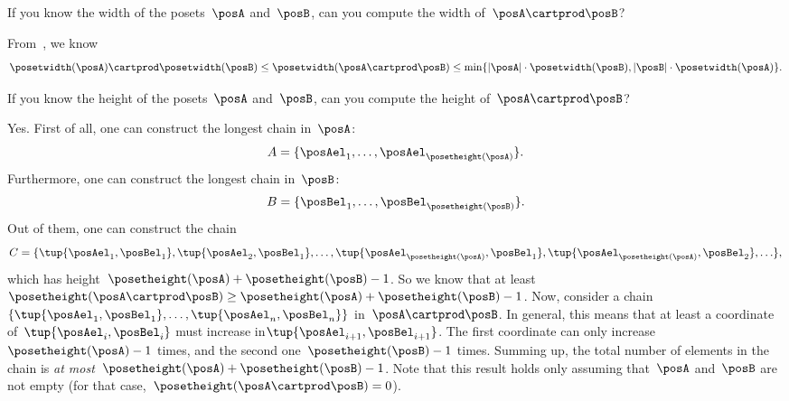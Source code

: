 \begin{exercise}
	\label{ex:width}
	If you know the width of the posets~$\posA$ and~$\posB$, can you compute the width of~$\posA\cartprod\posB$?
\end{exercise}
\begin{solution}
	From~\cite{bezrukovantichains}, we know
	\begin{equation*}
		\posetwidth(\posA)\cartprod \posetwidth(\posB)\leq \posetwidth(\posA\cartprod \posB)\leq \min \{ \vert \posA\vert \cdot \posetwidth(\posB),\vert \posB \vert \cdot \posetwidth(\posA)\}.
	\end{equation*}
\end{solution}

\begin{exercise}
	\label{ex:height}
	If you know the height of the posets~$\posA$ and~$\posB$, can you compute the height of~$\posA\cartprod\posB$?
\end{exercise}
%
\begin{solution}
	Yes.
	First of all, one can construct the longest chain in~$\posA$:
	\begin{equation*}
		A=\{\posAel_1,\ldots, \posAel_{\posetheight(\posA)}\}.
	\end{equation*}
	Furthermore, one can construct the longest chain in~$\posB$:
	\begin{equation*}
		B=\{\posBel_1,\ldots, \posBel_{\posetheight(\posB)}\}.
	\end{equation*}
	Out of them, one can construct the chain
	\begin{equation*}
		C=\{ \tup{\posAel_1,\posBel_1},\tup{\posAel_2,\posBel_1},\ldots, \tup{\posAel_{\posetheight(\posA)}, \posBel_1}, \tup{\posAel_{\posetheight(\posA)}, \posBel_2},\ldots\},
	\end{equation*}
	which has height~$\posetheight(\posA)+\posetheight(\posB)-1$.
	So we know that at least~$\posetheight(\posA\cartprod \posB)\geq \posetheight(\posA)+\posetheight(\posB)-1$.
	Now, consider a chain~$\{\tup{\posAel_1,\posBel_1},\ldots, \tup{\posAel_n,\posBel_n}\}$ in~$\posA\cartprod \posB$.
	In general, this means that at least a coordinate of~$\tup{\posAel_{i},\posBel_{i}}$ must increase in$\tup{\posAel_{i+1},\posBel_{i+1}}$.
	The first coordinate can only increase~$\posetheight(\posA)-1$ times, and the second one~$\posetheight(\posB)-1$ times.
	Summing up, the total number of elements in the chain is \emph{at most}~$\posetheight(\posA)+\posetheight(\posB)-1$.
	Note that this result holds only assuming that~$\posA$ and~$\posB$ are not empty (for that case,~$\posetheight(\posA\cartprod \posB)=0$).
\end{solution}